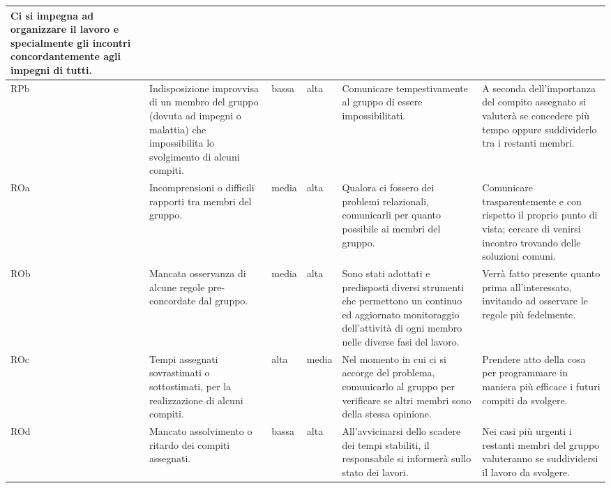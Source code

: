 {\begin{longtable}{|p{0.8cm}|p{3cm}|p{1cm}|p{1cm}|p{3cm}|p{3.2cm}|}
        Ci si impegna ad organizzare il lavoro e specialmente gli incontri concordantemente agli impegni di tutti. \\
        \hline
        RPb &
        Indisposizione improvvisa di un membro del gruppo (dovuta ad impegni o malattia) che impossibilita lo svolgimento di alcuni compiti. &
        bassa &
        alta &
        Comunicare tempestivamente al gruppo di essere impossibilitati. &
        A seconda dell'importanza del compito assegnato si valuterà se concedere più tempo oppure suddividerlo tra i restanti membri. \\
        \hline
        ROa &
        Incomprensioni o difficili rapporti tra membri del gruppo. &
        media &
        alta &
        Qualora ci fossero dei problemi relazionali, comunicarli per quanto possibile ai membri del gruppo. &
        Comunicare trasparentemente e con rispetto il proprio punto di vista; cercare di venirsi incontro trovando delle soluzioni comuni. \\
        \hline
        ROb &
        Mancata osservanza di alcune regole pre-concordate dal gruppo. &
        media &
        alta &
        Sono stati adottati e predisposti diversi strumenti che permettono un continuo ed aggiornato monitoraggio dell'attività di ogni membro nelle diverse fasi del lavoro. &
        Verrà fatto presente quanto prima all'interessato, invitando ad osservare le regole più fedelmente. \\
        \hline
        ROc &
        Tempi assegnati sovrastimati o sottostimati, per la realizzazione di alcuni compiti. &
        alta &
        media &
        Nel momento in cui ci si accorge del problema, comunicarlo al gruppo per verificare se altri membri sono della stessa opinione. &
        Prendere atto della cosa per programmare in maniera più efficace i futuri compiti da svolgere. \\
        \hline
        ROd &
        Mancato assolvimento o ritardo dei compiti assegnati. &
        bassa &
        alta &
        All'avvicinarsi dello scadere dei tempi stabiliti, il responsabile si informerà sullo stato dei lavori. &
        Nei casi più urgenti i restanti membri del gruppo valuteranno se suddividersi il lavoro da svolgere. \\
        \hline
    
        \end{longtable}
    }